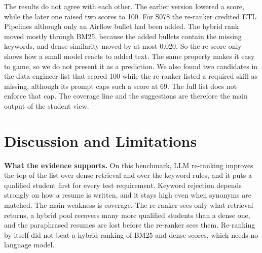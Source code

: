 \documentclass[conference]{IEEEtran}
\begin{document}
\begin{table}[!t]
\caption{What-if re-scoring for four students (examples, not measurements). The first two rows use an earlier version that appended a hypothetical bullet or an assumed-skills line for one skill (TypeScript).}
\label{tab:whatif}
\centering\scriptsize
{}
\end{table}

The results do not agree with each other. The earlier version lowered a score, while the later one raised two scores to 100. For S078 the re-ranker credited ETL Pipelines although only an Airflow bullet had been added. The hybrid rank moved mostly through BM25, because the added bullets contain the missing keywords, and dense similarity moved by at most 0.020. So the re-score only shows how a small model reacts to added text. The same property makes it easy to game, so we do not present it as a prediction. We also found two candidates in the data-engineer list that scored 100 while the re-ranker listed a required skill as missing, although its prompt caps such a score at 69. The full list does not enforce that cap. The coverage line and the suggestions are therefore the main output of the student view.

\section{Discussion and Limitations}
\textbf{What the evidence supports.} On this benchmark, LLM re-ranking improves the top of the list over dense retrieval and over the keyword rules, and it puts a qualified student first for every test requirement. Keyword rejection depends strongly on how a resume is written, and it stays high even when synonyms are matched. The main weakness is coverage. The re-ranker sees only what retrieval returns, a hybrid pool recovers many more qualified students than a dense one, and the paraphrased resumes are lost before the re-ranker sees them. Re-ranking by itself did not beat a hybrid ranking of BM25 and dense scores, which needs no language model.
\end{document}
